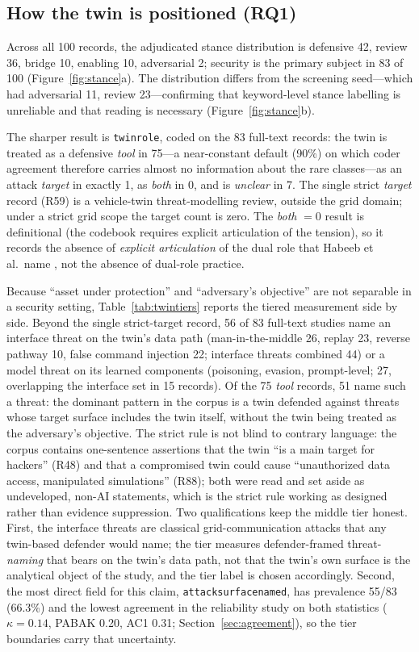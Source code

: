 \documentclass[preprint,12pt]{elsarticle}
\renewcommand{\_}{\plainunderscore\allowbreak}
\begin{document}
\subsection{How the twin is positioned (RQ1)}
\label{sec:stance}

Across all 100 records, the adjudicated stance distribution is defensive 42, review 36, bridge
10, enabling 10, adversarial 2; security is the primary subject in 83 of 100
(Figure~\ref{fig:stance}a). The distribution differs from the screening seed---which had
adversarial 11, review 23---confirming that keyword-level stance labelling is unreliable and that
reading is necessary (Figure~\ref{fig:stance}b).

The sharper result is \texttt{twin\_role}, coded on the 83 full-text records: the twin is treated
as a defensive \emph{tool} in 75---a near-constant default (90\%) on which coder agreement
therefore carries almost no information about the rare classes---as an attack \emph{target}
in exactly 1, as \emph{both} in 0,
and is \emph{unclear} in 7. The single strict \emph{target} record (R59) is a
vehicle-twin threat-modelling review, outside the grid domain; under a strict grid scope the
target count is zero. The \emph{both} $=0$ result is definitional (the codebook requires
explicit articulation of the tension), so it records the absence of \emph{explicit
articulation} of the dual role that Habeeb et al.\ name \cite{habeeb2026}, not the absence of
dual-role practice.

Because ``asset under protection'' and ``adversary's objective'' are not separable in a
security setting, Table~\ref{tab:twintiers} reports the tiered measurement side by side.
Beyond the single strict-target record, 56 of 83 full-text studies name an interface
threat on the twin's data path (man-in-the-middle 26, replay 23, reverse pathway 10,
false command injection 22; interface threats combined 44) or a model threat on its
learned components (poisoning, evasion, prompt-level; 27, overlapping the interface set
in 15 records). Of the 75 \emph{tool} records, 51 name such a threat: the dominant
pattern in the corpus is a twin defended against threats whose target surface includes
the twin itself, without the twin being treated as the adversary's objective. The strict
rule is not blind to contrary language: the corpus contains one-sentence assertions that
the twin ``is a main target for hackers'' (R48) and that a compromised twin could cause
``unauthorized data access, manipulated simulations'' (R88); both were read and set aside
as undeveloped, non-AI statements, which is the strict rule working as designed rather
than evidence suppression. Two qualifications keep the middle tier honest.
First, the interface threats are classical grid-communication attacks that any twin-based
defender would name; the tier measures defender-framed threat-\emph{naming} that bears on
the twin's data path, not that the twin's own surface is the analytical object of the
study, and the tier label is chosen accordingly. Second, the most direct field for this
claim, \texttt{attack\_surface\_named}, has prevalence 55/83 (66.3\%) and
the lowest agreement in the reliability study on both statistics ($\kappa = 0.14$, PABAK
0.20, AC1 0.31; Section~\ref{sec:agreement}), so the tier boundaries carry that
uncertainty.
\end{document}
